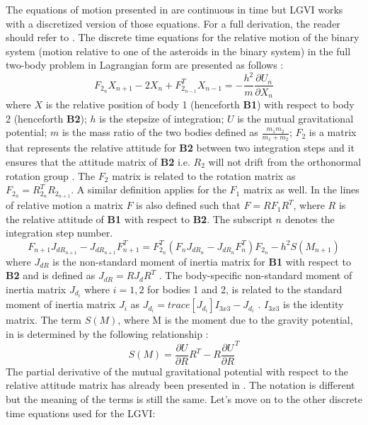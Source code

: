 The equations of motion presented in  are continuous in time but \gls{LGVI} works with a discretized version of those equations. For a full derivation, the reader should refer to \cite{lee_lgvi}. The discrete time equations for the relative motion of the binary system (motion relative to one of the asteroids in the binary system) in the full two-body problem in Lagrangian form are presented as follows \cite{lee_lgvi}:
\begin{equation}
\label{lgvi1}
F_{2_n} X_{n+1} - 2X_n + F_{2_{n-1}}^T X_{n-1} = -\frac{h^2}{m} \frac{\partial U_n}{\partial X_n}
\end{equation}
%
where $X$ is the relative position of body 1 (henceforth \textbf{B1}) with respect to body 2 (henceforth \textbf{B2}); $h$ is the stepsize of integration; $U$ is the mutual gravitational potential; $m$ is the mass ratio of the two bodies defined as $\frac{m_1m_2}{m_1 + m_2}$; $F_2$ is a matrix that represents the relative attitude for \textbf{B2} between two integration steps and it ensures that the attitude matrix of \textbf{B2} i.e. $R_2$ will not drift from the orthonormal rotation group \cite{lee_lgvi}. The $F_2$ matrix is related to the rotation matrix as $F_{2_n} = R_{2_n}^T R_{2_{n+1}}$. A similar definition applies for the $F_1$ matrix as well. In the lines of relative motion a matrix $F$ is also defined such that $F = RF_1R^T$, where $R$ is the relative attitude of \textbf{B1} with respect to \textbf{B2}. The subscript $n$ denotes the integration step number.
%
\begin{equation}
\label{lgvi2}
F_{n+1} J_{dR_{n+1}} - J_{dR_{n+1}}F_{n+1}^T = F_{2_n}^T (F_n J_{dR_n} - J_{dR_n} F_n^T) F_{2_n} - h^2 S(M_{n+1})
\end{equation}
%
where $J_{dR}$ is the non-standard moment of inertia matrix for \textbf{B1} with respect to \textbf{B2} and is defined as $J_{dR} = R J_d R^T$ \cite{lee_lgvi}. The body-specific non-standard moment of inertia matrix $J_{d_i}$ where $i=1,2$ for bodies 1 and 2, is related to the standard moment of inertia matrix $J_i$ as $J_{d_i} = trace[J_{d_i}]I_{3x3} - J_{d_i}$ \cite{lee_lgvi}. $I_{3x3}$ is the identity matrix. The term $S(M)$, where M is the moment due to the gravity potential, in  is determined by the following relationship \cite{fahn_lgvi}:
\begin{equation}
S(M) = \frac{\partial U}{\partial R} R^T - R \frac{\partial U}{\partial R}^T
\end{equation}
%
The partial derivative of the mutual gravitational potential with respect to the relative attitude matrix has already been presented in . The notation is different but the meaning of the terms is still the same. Let's move on to the other discrete time equations used for the \gls{LGVI}:
